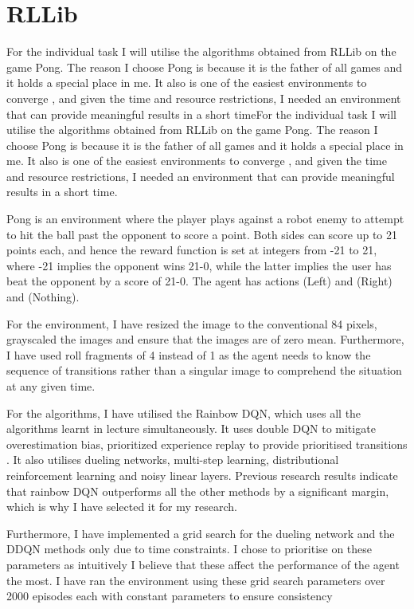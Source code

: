 \renewcommand{\thesection}{Advanced Task (Individual)}
\section{RLLib}
For the individual task I will utilise the algorithms obtained from RLLib on the game Pong. The reason I choose Pong is because it is the father of all games and it holds a special place in me. It also is one of the easiest environments to converge \cite{Pong}, and given the time and resource restrictions, I needed an environment that can provide meaningful results in a short timeFor the individual task I will utilise the algorithms obtained from RLLib on the game Pong. The reason I choose Pong is because it is the father of all games and it holds a special place in me. It also is one of the easiest environments to converge \cite{Pong}, and given the time and resource restrictions, I needed an environment that can provide meaningful results in a short time.

Pong is an environment where the player plays against a robot enemy to attempt to hit the ball past the opponent to score a point. Both sides can score up to 21 points each, and hence the reward function is set at integers from -21 to 21, where -21 implies the opponent wins 21-0, while the latter implies the user has beat the opponent by a score of 21-0. The agent has actions (Left) and (Right) and (Nothing).

For the environment, I have resized the image to the conventional 84  pixels, grayscaled the images and ensure that the images are of zero mean. Furthermore, I have used roll fragments of 4 instead of 1 as the agent needs to know the sequence of transitions rather than a singular image to comprehend the situation at any given time.

For the algorithms, I have utilised the Rainbow DQN, which uses all the algorithms learnt in lecture simultaneously. It uses double DQN to mitigate overestimation bias, prioritized experience replay to provide prioritised transitions \cite{hessel2017rainbow}. It also utilises dueling networks, multi-step learning, distributional reinforcement learning and noisy linear layers. Previous research results indicate that rainbow DQN outperforms all the other methods by a significant margin, which is why I have selected it for my research.

Furthermore, I have implemented a grid search for the dueling network and the DDQN methods only due to time constraints. I chose to prioritise on these parameters as intuitively I believe that these affect the performance of the agent the most. I have ran the environment using these grid search parameters over 2000 episodes each with constant parameters to ensure consistency

